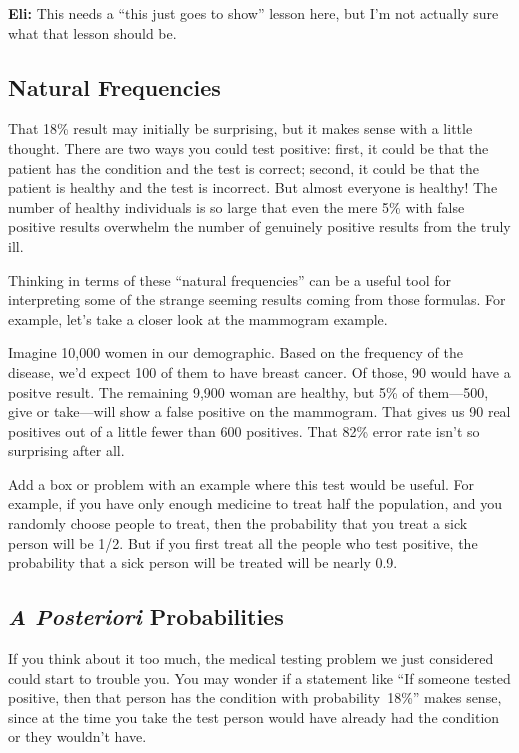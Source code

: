 \begin{editingnotes}
\textbf{Eli:} This needs a ``this just goes to show'' lesson here, but I'm not
actually sure what that lesson should be.
\end{editingnotes}

\subsection{Natural Frequencies}

That 18\% result may initially be surprising, but it makes sense with
a little thought.  There are two ways you could test positive: first,
it could be that the patient has the condition and the test is
correct; second, it could be that the patient is healthy and the test
is incorrect.  But almost everyone is healthy!  The number of healthy
individuals is so large that even the mere 5\% with false positive
results overwhelm the number of genuinely positive results from the
truly ill.

Thinking in terms of these ``natural frequencies'' can be a useful
tool for interpreting some of the strange seeming results coming from
those formulas.  For example, let's take a closer look at the
mammogram example.

Imagine 10,000 women in our demographic.  Based on the frequency of
the disease, we'd expect 100 of them to have breast cancer.  Of those,
90 would have a positve result.  The remaining 9,900 woman are healthy,
but 5\% of them---500, give or take---will show a false positive on
the mammogram.  That gives us 90 real positives out of a little fewer
than 600 positives.  That 82\% error rate isn't so surprising after all.

\begin{editingnotes}
Add a box or problem with an example where this test would be useful.
For example, if you have only enough medicine to treat half the
population, and you randomly choose people to treat, then the
probability that you treat a sick person will be 1/2.  But if you
first treat all the people who test positive, the probability that a
sick person will be treated will be nearly 0.9.
\end{editingnotes}


\subsection{\emph{A Posteriori} Probabilities}\label{aposteriori_subsec}

If you think about it too much, the medical testing problem we just
considered could start to trouble you.  You may wonder if a statement
like ``If someone tested positive, then that person has the condition with
probability~18\%'' makes sense, since at the time you take the test
person would have already had the condition or they wouldn't have.

